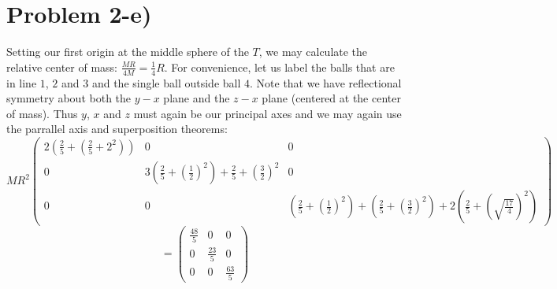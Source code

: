\section*{Problem 2-e)}
Setting our first origin at the middle sphere of the $T$, we may  calculate the relative center of mass: $\frac{MR}{4M} = \frac{1}{4} R$. For convenience, let us label the balls that are in line $1$, $2$ and $3$ and the single ball outside ball $4$. Note that we have reflectional symmetry about both the $y-x$ plane and the $z-x$ plane (centered at the center of mass). Thus $y$, $x$ and $z$ must again be our principal axes and we may again use the parrallel axis and superposition theorems:
\[MR^2 \begin{pmatrix}
2(\frac{2}{5}+(\frac{2}{5}+2^2)) & 0 & 0 \\ 
0 & 3(\frac{2}{5} + \left(\frac{1}{2}\right)^2) + \frac{2}{5} + \left(\frac{3}{2}\right)^2  & 0 \\ 
0 & 0 & (\frac{2}{5} + \left(\frac{1}{2}\right)^2) + (\frac{2}{5} + \left(\frac{3}{2}\right)^2) + 2 (\frac{2}{5} + \left(\sqrt{\frac{17}{4}}\right)^2)
\end{pmatrix}
\]\[= \begin{pmatrix}
\frac{48}{5} & 0 & 0 \\
0 & \frac{23}{5} & 0 \\
0 & 0 & \frac{63}{5}
\end{pmatrix}\]
